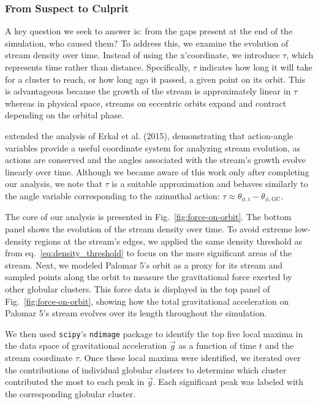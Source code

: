 \documentclass[draft]{aa}
\begin{document}
    
    \subsubsection*{From Suspect to Culprit} \label{SuspectToCulprit}

      A key question we seek to answer is: from the gaps present at the end of the simulation, who caused them? To address this, we examine the evolution of stream density over time. Instead of using the x'coordinate, we introduce $\tau$, which represents time rather than distance. Specifically, $\tau$ indicates how long it will take for a cluster to reach, or how long ago it passed, a given point on its orbit. This is advantageous because the growth of the stream is approximately linear in $\tau$ whereas in physical space, streams on eccentric orbits expand and contract depending on the orbital phase.


      \citet{sanders2016dynamics} extended the analysis of Erkal et al. (2015), demonstrating that action-angle variables provide a useful coordinate system for analyzing stream evolution, as actions are conserved and the angles associated with the stream's growth evolve linearly over time. Although we became aware of this work only after completing our analysis, we note that $\tau$ is a suitable approximation and behaves similarly to the angle variable corresponding to the azimuthal action: $\tau \approx \theta_{\phi,i} - \theta_{\phi,\text{GC}}$.

      The core of our analysis is presented in Fig.~\ref{fig:force-on-orbit}. The bottom panel shows the evolution of the stream density over time. To avoid extreme low-density regions at the stream's edges, we applied the same density threshold as from eq.~\ref{eq:density_threshold} to focus on the more significant areas of the stream. Next, we modeled Palomar 5's orbit as a proxy for its stream and sampled points along the orbit to measure the gravitational force exerted by other globular clusters. This force data is displayed in the top panel of Fig.~\ref{fig:force-on-orbit}, showing how the total gravitational acceleration on Palomar 5's stream evolves over its length throughout the simulation.

      We then used \texttt{scipy}'s \texttt{ndimage} package to identify the top five local maxima in the data space of gravitational acceleration $\vec{g}$ as a function of time $t$ and the stream coordinate $\tau$. Once these local maxima were identified, we iterated over the contributions of individual globular clusters to determine which cluster contributed the most to each peak in $\vec{g}$. Each significant peak was labeled with the corresponding globular cluster.
\end{document}
